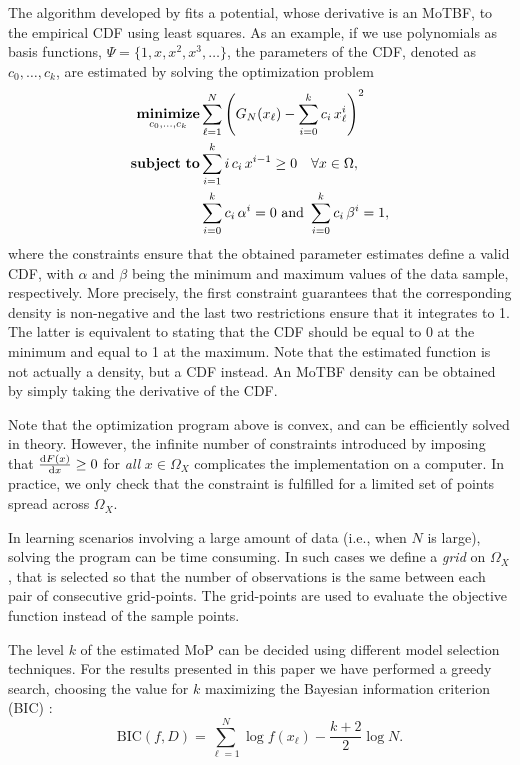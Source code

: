 The algorithm developed by \cite{Lan14} fits a potential, whose derivative is an MoTBF, to the empirical CDF using least squares.
As an example, if we use polynomials as basis functions, 
$\Psi=\{1, x, x^2,x^3,\ldots\}$, the parameters of the CDF, denoted as $c_0,\ldots,c_k$, are estimated by solving 
the optimization problem
\begin{align}
\underset{c_0,\ldots,c_k}{\mathbf{minimize}} & \displaystyle  \sum_{\ell=1}^N \left(G_N(x_\ell) - \sum_{i=0}^{k} c_{i}\,x_\ell^i\right) ^2  \notag  \\
\mathbf{subject~to} & \displaystyle \sum_{i=1}^{k} i \,c_{i}\,x^{i-1} \geq 0  \quad \forall x\in \Omega ,  \label{eq:program_MOP}\\
& \displaystyle \sum_{i=0}^{k} c_{i}\,\alpha^i =0 \notag 
\text{ and }    \notag 
\displaystyle \sum_{i=0}^{k} c_{i}\,\beta^i =1,  \notag
\end{align}
where the constraints ensure that the obtained parameter estimates define a valid CDF, with $\alpha$ and $\beta$ being
the minimum and maximum values of the data sample, respectively. More precisely, the first constraint guarantees that
the corresponding density is non-negative and the last two restrictions ensure that it integrates to 1. The
latter is 
equivalent to stating that the CDF should be equal to 0 at the minimum and equal to 1 at the maximum.
Note that the estimated function is not actually a density, but a  CDF instead. An MoTBF density can be
obtained by simply taking the derivative of the CDF.

Note that the optimization program above is convex, and can be efficiently solved in theory. However, the infinite 
number of constraints introduced by imposing that $\frac{{\rm d} F(x)}{{\rm d}x} \geq 0$ for {\em all} $x\in \Omega_X$ 
complicates the implementation on a computer. In practice, we only check that the constraint is fulfilled for a limited set of 
points spread across $\Omega_X$.

In learning scenarios involving a  large amount of data (i.e., when $N$ is large), solving the program can be time 
consuming. In such cases we  define a {\em grid} on $\Omega_X$, that is selected so that the number of observations 
is the same between each pair of consecutive grid-points. The grid-points are used to evaluate the objective function
instead of the sample points. 

The level $k$ of the estimated MoP can be decided using different model selection techniques. 
For the results presented in this paper we have performed a greedy search, choosing the value for $k$
maximizing the Bayesian information criterion (BIC) \citep{Sch78}:
\begin{equation}
\label{eq:bic}
\text{BIC}(f,D) = \sum_{\ell=1}^N \log f(x_\ell) - \frac{k+2}{2} \log N.
\end{equation}

